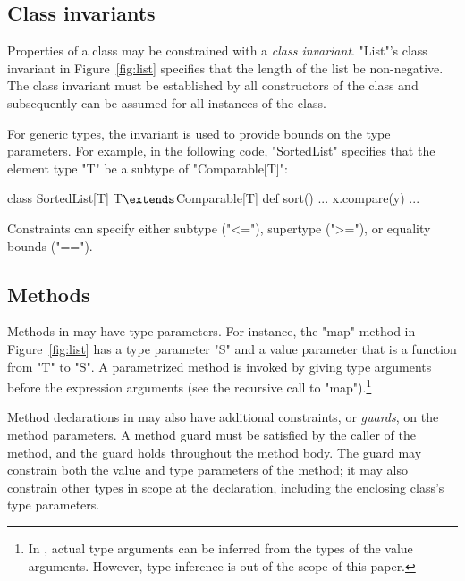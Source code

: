 \subsection{Class invariants}

Properties of a class may be constrained with 
a \emph{class invariant}.
\xcd"List"'s class invariant in
Figure~\ref{fig:list} specifies that the length of
the list be non-negative.
The class invariant must be established by all constructors of
the class and subsequently can be assumed for all instances of the class.

For generic types, the invariant is used to provide 
bounds on the type parameters.
For example, in the following code,
\xcd"SortedList" 
specifies that the element type \xcd"T"
be a subtype of \xcd"Comparable[T]":
\begin{xtenmath}
class SortedList[T] {T$\extends$Comparable[T]} {
  def sort() { ... x.compare(y) ... }
}
\end{xtenmath}
Constraints can specify either subtype (\xcd"<="), supertype (\xcd">="),
or equality bounds (\xcd"==").

\subsection{Methods}

Methods in \Xten may have type parameters.  
For instance, the \xcd"map" method in Figure~\ref{fig:list} 
has a type parameter \xcd"S" and a value parameter that is a
function from \xcd"T" to \xcd"S".
A parametrized method is invoked by giving type arguments before the
expression arguments (see the recursive call to
\xcd"map").\footnote{In \Xten, actual type arguments can be
inferred from the types of the value arguments.  However, type
inference is out of the scope of this paper.}

Method declarations in \Xten
may also have additional
constraints, or \emph{guards}, on the method parameters.  A
method guard must be satisfied by the caller of the method, and
the guard holds throughout the method body.
The guard may constrain both the value and type parameters of
the method; it may also constrain other types in
scope at the declaration, including the enclosing class's type parameters.

